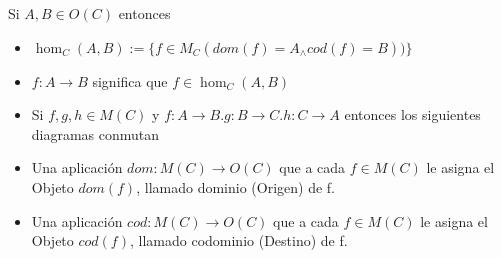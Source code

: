 \begin{note}
Si $A,B \in O(C)$ entonces 

\begin{itemize}
\item $\hom_{C}(A,B):= \{ f \in M_{C}(dom(f)=A _{\wedge} cod(f)=B)) \}$
\item $f: A \to B$ significa que $f \in \hom_{C}(A,B)$
\item Si $f,g,h \in M(C)$ y $f:A \to B.g:B \to C.h:C \to A$ entonces los siguientes diagramas conmutan

	
\end{itemize}
\end{note}

\begin{defn}
\end{defn}
\begin{itemize}
\item Una aplicación $dom : M(C) \to O(C)$ que a cada $f \in M(C)$ le
asigna el Objeto $dom(f)$, llamado dominio (Origen) de f.
\item Una aplicación $cod : M(C) \to O(C)$ que a cada $f \in M(C)$ le
asigna el Objeto $cod(f)$, llamado codominio (Destino) de f.
\end{itemize}